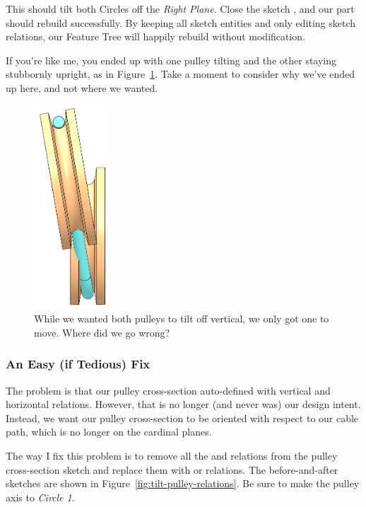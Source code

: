 This should tilt both
Circles off the \emph{Right Plane}. Close the sketch
, and our part should rebuild
successfully. By keeping all sketch entities and only editing sketch relations,
our Feature Tree will happily rebuild without modification.

If you're like me, you ended up with one pulley tilting and the other staying
stubbornly upright, as in Figure~\ref{fig:pulley-not-tilted}. Take a moment to
consider why we've ended up here, and not where we wanted.

\begin{figure}[H]
\begin{center}
  \includegraphics[height=3in]{images/figures/pulley-not-tilted.png}
\end{center}
\caption{While we wanted both pulleys to tilt off vertical, we only got one to move.
Where did we go wrong? \label{fig:pulley-not-tilted}}

\end{figure}

\subsubsection{An Easy (if Tedious) Fix}

The problem is that our pulley cross-section auto-defined with vertical and
horizontal relations. However, that is no longer (and never was) our design intent.
Instead, we want our pulley cross-section to be oriented with respect to our
cable path, which is no longer on the cardinal planes.

The way I fix this problem is to remove all the  and
 relations from the pulley cross-section sketch and replace them with
 or  relations. The before-and-after
sketches are shown in Figure~\ref{fig:tilt-pulley-relations}. Be sure to make
the pulley axis  to \emph{Circle 1}.

